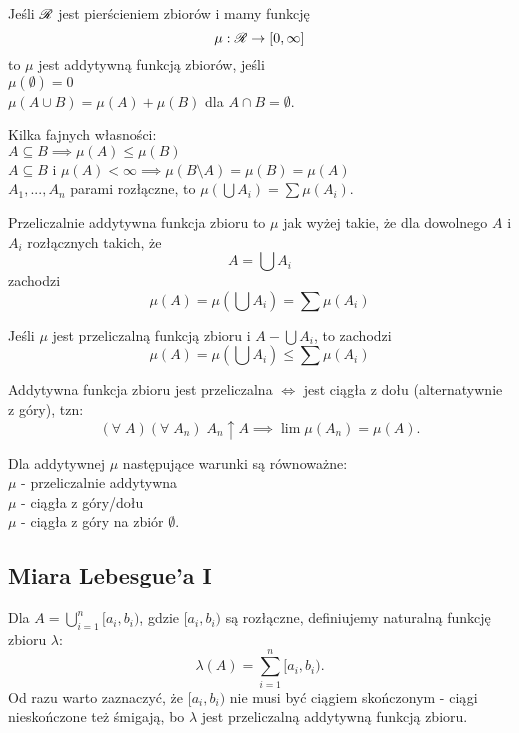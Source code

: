\begin{multicols}{2}

Jeśli $\mathcal{R}$ jest pierścieniem zbiorów i mamy funkcję 
$$\mu:\mathcal{R}\to[0,\infty]$$
to $\mu$ jest {\color{def}addytywną funkcją zbiorów}, jeśli\smallskip\\
\point $\mu(\emptyset)=0$\\
\point $\mu(A\cup B)=\mu(A)+\mu(B)$ dla $A\cap B=\emptyset$.

Kilka fajnych {\color{acc}własności}:\smallskip\\
\point $A\subseteq B\implies \mu(A)\leq\mu(B)$\\
\point $A\subseteq B$ i $\mu(A)<\infty\implies \mu(B\setminus A)=\mu(B)=\mu(A)$\\
\point $A_1,..., A_n$ parami rozłączne, to $\mu(\bigcup A_i)=\sum\mu(A_i)$.
\medskip

{\color{def}Przeliczalnie addytywna funkcja zbioru} to $\mu$ jak wyżej takie, że dla dowolnego $A$ i $A_i$ rozłącznych takich, że
$$A=\bigcup A_i$$
zachodzi
$$\mu(A)=\mu(\bigcup A_i)=\sum\mu(A_i)$$

Jeśli $\mu$ jest przeliczalną funkcją zbioru i $A-\bigcup A_i$, to zachodzi
$$\mu(A)=\mu(\bigcup A_i)\leq \sum\mu(A_i)$$

Addytywna funkcja zbioru jest przeliczalna $\iff$ jest {\color{acc}ciągła z dołu} (alternatywnie z góry), tzn:
$$(\forall\;A)(\forall\;A_n)\;A_n\uparrow A\implies \lim\mu(A_n)=\mu(A).$$

Dla addytywnej $\mu$  {\color{acc}następujące warunki są równoważne}:\smallskip\\
\point $\mu$ - przeliczalnie addytywna\\
\point $\mu$ - ciągła z góry/dołu\\
\point $\mu$ - ciągła z góry na zbiór $\emptyset$.

\end{multicols}
\bigskip

\bigskip

\subsection{Miara Lebesgue'a I}

\begin{multicols*}{2}

Dla $A=\bigcup\limits_{i=1}^n[a_i, b_i)$, gdzie $[a_i, b_i)$ są rozłączne, definiujemy {\color{def}naturalną funkcję zbioru} $\lambda$:
$$\lambda(A)=\sum\limits_{i=1}^n[a_i,b_i).$$
Od razu warto zaznaczyć, że $[a_i,b_i)$ nie musi być ciągiem skończonym - ciągi nieskończone też śmigają, bo $\lambda$ jest przeliczalną addytywną funkcją zbioru.

\end{multicols*}